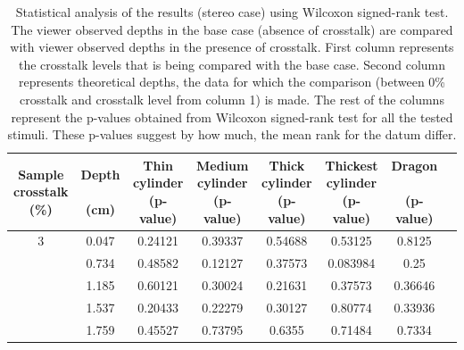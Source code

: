 \begin{table}[H]
  \begin{center}
    \caption{Statistical analysis of the results (stereo case) using Wilcoxon signed-rank test. The viewer observed depths in the base case (absence of crosstalk) are compared with viewer observed depths in the presence of crosstalk. First column  represents the crosstalk levels that is being compared with the base case. Second column represents theoretical depths, the data for which the comparison (between 0\% crosstalk and crosstalk level from column 1) is made. The rest of the columns represent the p-values obtained from Wilcoxon signed-rank test for all the tested stimuli. These p-values suggest by how much, the mean rank for the datum differ. }
    \label{tab:posthoc_stereo}
    \begin{tabular}{cccccccc}
      \toprule
      \specialcell{Sample\\crosstalk\\(\%)} & \specialcell{Depth \\ \\(cm)} & \specialcell{Thin \\cylinder \\(p-value)} & \specialcell{Medium \\cylinder \\(p-value)} & \specialcell{Thick \\cylinder \\(p-value)} & \specialcell{Thickest \\cylinder \\(p-value)} & \specialcell{Dragon \\ \\(p-value)}\\
      \midrule
         3 & 0.047     & 0.24121                     & 0.39337                   & 0.54688                   & 0.53125           & 0.8125 \\
           & 0.734      & 0.48582                     & 0.12127                   & 0.37573                   & 0.083984          & 0.25 \\
           & 1.185       & 0.60121                     & 0.30024                   & 0.21631                   & 0.37573           & 0.36646 \\
           & 1.537       & 0.20433                     & 0.22279                   & 0.30127                   & 0.80774           & 0.33936 \\
           & 1.759        & 0.45527                     & 0.73795                   & 0.6355                    & 0.71484           & 0.7334 \\

\end{tabular}
\end{center}
\end{table}
